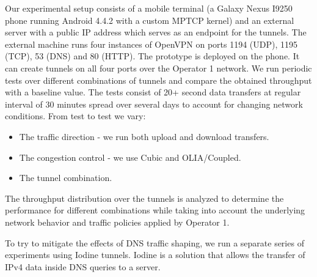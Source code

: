 Our experimental setup consists of a mobile terminal (a Galaxy Nexus I9250 phone running Android 4.4.2 with a custom MPTCP kernel) and an external server with a public IP address which serves as an endpoint for the tunnels. The external machine runs four instances of OpenVPN on ports 1194 (UDP), 1195 (TCP), 53 (DNS) and 80 (HTTP). The prototype is deployed on the phone. It can create tunnels on all four ports over the Operator 1 network. We run periodic tests over different combinations of tunnels and compare the obtained throughput with a baseline value. The tests consist of 20+ second data transfers at regular interval of 30 minutes spread over several days to account for changing network conditions. From test to test we vary:

\begin{itemize}
\item The traffic direction - we run both upload and download transfers.
\item The congestion control - we use Cubic and OLIA/Coupled.
\item The tunnel combination.
\end{itemize}

The throughput distribution over the tunnels is analyzed to determine the performance for different combinations while taking into account the underlying network behavior and traffic policies applied by Operator 1.

To try to mitigate the effects of DNS traffic shaping, we run a separate series of experiments using Iodine tunnels. Iodine is a solution that allows the transfer of IPv4 data inside DNS queries to a server.
